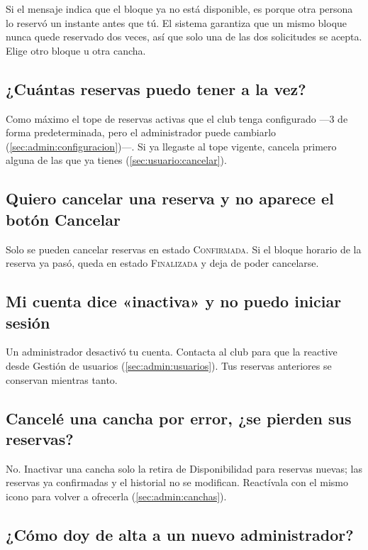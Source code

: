Si el mensaje indica que el bloque ya no está disponible, es porque otra
persona lo reservó un instante antes que tú. El sistema garantiza que un
mismo bloque nunca quede reservado dos veces, así que solo una de las dos
solicitudes se acepta. Elige otro bloque u otra cancha.

\subsection*{¿Cuántas reservas puedo tener a la vez?}

Como máximo el tope de reservas activas que el club tenga configurado —3
de forma predeterminada, pero el administrador puede cambiarlo
(\cref{sec:admin:configuracion})—. Si ya llegaste al tope vigente,
cancela primero alguna de las que ya tienes (\cref{sec:usuario:cancelar}).

\subsection*{Quiero cancelar una reserva y no aparece el botón Cancelar}

Solo se pueden cancelar reservas en estado \textsc{Confirmada}. Si el
bloque horario de la reserva ya pasó, queda en estado \textsc{Finalizada}
y deja de poder cancelarse.

\subsection*{Mi cuenta dice «inactiva» y no puedo iniciar sesión}

Un administrador desactivó tu cuenta. Contacta al club para que la
reactive desde Gestión de usuarios (\cref{sec:admin:usuarios}). Tus
reservas anteriores se conservan mientras tanto.

\subsection*{Cancelé una cancha por error, ¿se pierden sus reservas?}

No. Inactivar una cancha solo la retira de Disponibilidad para reservas
nuevas; las reservas ya confirmadas y el historial no se modifican.
Reactívala con el mismo icono para volver a ofrecerla
(\cref{sec:admin:canchas}).

\subsection*{¿Cómo doy de alta a un nuevo administrador?}

